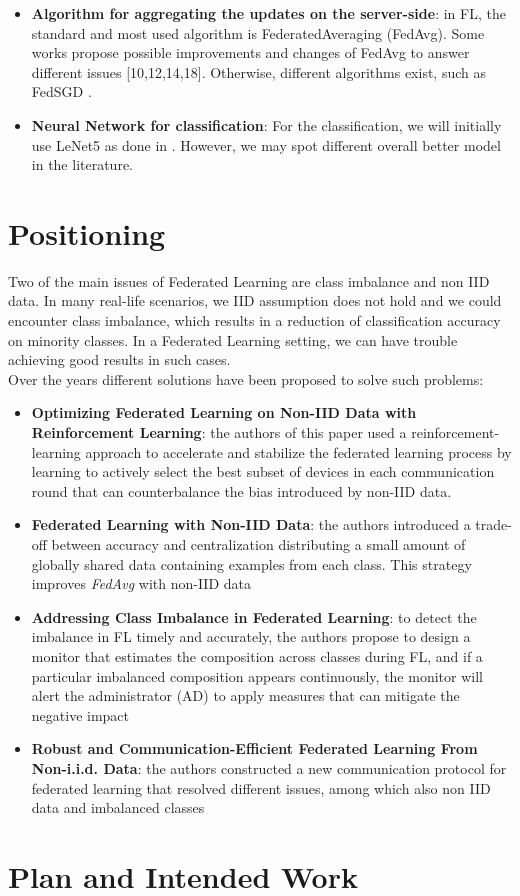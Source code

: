 \documentclass{article}
\begin{document}
\begin{itemize}
    \item \textbf{Algorithm for aggregating the updates on the server-side}: in FL, the standard and most
used algorithm is FederatedAveraging (FedAvg). Some works propose possible improvements and changes of FedAvg to answer different issues \cite{DBLP:journals/corr/abs-1812-06127}[10,12,14,18]. Otherwise, different algorithms exist, such as FedSGD \cite{pmlr-v54-mcmahan17a}.
\item \textbf{Neural Network for classification}: For the classification, we will initially use LeNet5 as done in \cite{DBLP:journals/corr/abs-2003-08082}. However, we may spot different overall better model in the literature.
\end{itemize}





\section{Positioning}
Two of the main issues\cite{ZHANG2021106775} of Federated Learning are class imbalance and non IID data. 
In many real-life scenarios, we IID assumption does not hold and we could encounter class imbalance, which results in a reduction of classification accuracy on minority classes. In a Federated Learning setting, we can have trouble achieving good results in such cases.\\
Over the years different solutions have been proposed to solve such problems:
\begin{itemize}
  \item \textbf{Optimizing Federated Learning on Non-IID Data
with Reinforcement Learning}\cite{9155494}: the authors of this paper used a reinforcement-learning approach to accelerate and stabilize the federated learning process by learning to actively select the best subset of devices in each communication round that can counterbalance the bias introduced by non-IID data.
  \item \textbf{Federated Learning with Non-IID Data}\cite{DBLP:journals/corr/abs-1806-00582}: the authors introduced a trade-off between accuracy and centralization distributing a small amount of globally shared data containing examples from each class. This strategy improves \emph{FedAvg} with non-IID data
  \item \textbf{Addressing Class Imbalance in Federated Learning}\cite{DBLP:journals/corr/abs-2008-06217}: to detect the imbalance in FL timely and accurately, the authors propose to design a monitor that estimates the composition across classes during FL, and if a particular imbalanced composition appears continuously, the monitor will alert the administrator (AD) to apply measures that can mitigate the negative impact
  \item \textbf{Robust and Communication-Efficient Federated Learning From Non-i.i.d. Data}\cite{DBLP:journals/corr/abs-1903-02891}: the authors constructed a new communication protocol for federated learning that resolved different issues, among which also non IID data and imbalanced classes
\end{itemize}



\section{Plan and Intended Work}
\newpage
\printbibliography
\end{document}
